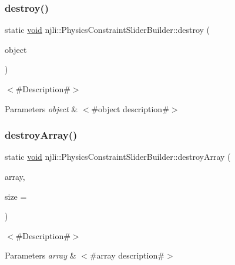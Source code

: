 \subsubsection{\texorpdfstring{destroy()}{destroy()}}
{\footnotesize\ttfamily static \mbox{\hyperlink{_thread_8h_af1e856da2e658414cb2456cb6f7ebc66}{void}} njli\+::\+Physics\+Constraint\+Slider\+Builder\+::destroy (\begin{DoxyParamCaption}\item[{\mbox{\hyperlink{classnjli_1_1_physics_constraint_slider_builder}{Physics\+Constraint\+Slider\+Builder}} $\ast$}]{object }\end{DoxyParamCaption})\hspace{0.3cm}{\ttfamily [static]}}

$<$\#\+Description\#$>$


\begin{DoxyParams}{Parameters}
{\em object} & $<$\#object description\#$>$ \\
\hline
\end{DoxyParams}
\mbox{\label{classnjli_1_1_physics_constraint_slider_builder_a2ecf524907abc5887dcc314a99297da8}} 
\subsubsection{\texorpdfstring{destroy\+Array()}{destroyArray()}}
{\footnotesize\ttfamily static \mbox{\hyperlink{_thread_8h_af1e856da2e658414cb2456cb6f7ebc66}{void}} njli\+::\+Physics\+Constraint\+Slider\+Builder\+::destroy\+Array (\begin{DoxyParamCaption}\item[{\mbox{\hyperlink{classnjli_1_1_physics_constraint_slider_builder}{Physics\+Constraint\+Slider\+Builder}} $\ast$$\ast$}]{array,  }\item[{const \mbox{\hyperlink{_util_8h_a10e94b422ef0c20dcdec20d31a1f5049}{u32}}}]{size = {} }\end{DoxyParamCaption})\hspace{0.3cm}{\ttfamily [static]}}

$<$\#\+Description\#$>$


\begin{DoxyParams}{Parameters}
{\em array} & $<$\#array description\#$>$ \\
\hline
\end{DoxyParams}
\mbox{\label{classnjli_1_1_physics_constraint_slider_builder_ae9cbc5f2a609e660a740fcca156c0a03}} 
